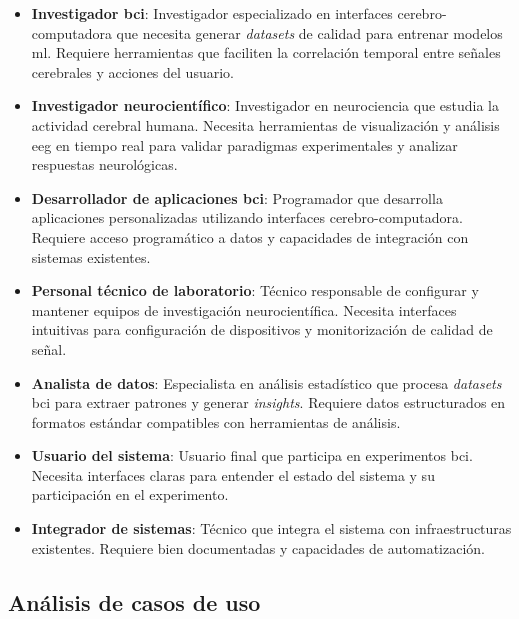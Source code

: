 \begin{itemize}
    \item \textbf{Investigador \acrshort{bci}}: Investigador especializado en interfaces cerebro-computadora que necesita generar \textit{\glspl{dataset}} de calidad para entrenar modelos \acrshort{ml}. Requiere herramientas que faciliten la correlación temporal entre señales cerebrales y acciones del usuario.

    \item \textbf{Investigador neurocientífico}: Investigador en neurociencia que estudia la actividad cerebral humana. Necesita herramientas de visualización y análisis \acrshort{eeg} en tiempo real para validar paradigmas experimentales y analizar respuestas neurológicas.

    \item \textbf{Desarrollador de aplicaciones \acrshort{bci}}: Programador que desarrolla aplicaciones personalizadas utilizando interfaces cerebro-computadora. Requiere acceso programático a datos y capacidades de integración con sistemas existentes.

    \item \textbf{Personal técnico de laboratorio}: Técnico responsable de configurar y mantener equipos de investigación neurocientífica. Necesita interfaces intuitivas para configuración de dispositivos y monitorización de calidad de señal.

    \item \textbf{Analista de datos}: Especialista en análisis estadístico que procesa \textit{\glspl{dataset}} \acrshort{bci} para extraer patrones y generar \textit{\gls{insights}}. Requiere datos estructurados en formatos estándar compatibles con herramientas de análisis.

    \item \textbf{Usuario del sistema}: Usuario final que participa en experimentos \acrshort{bci}. Necesita interfaces claras para entender el estado del sistema y su participación en el experimento.

    \item \textbf{Integrador de sistemas}: Técnico que integra el sistema con infraestructuras existentes. Requiere  bien documentadas y capacidades de automatización.
\end{itemize}

\subsection{Análisis de casos de uso}
\label{subsec:analisis_casos_uso}

